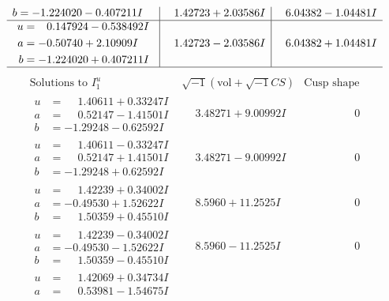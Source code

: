 \documentclass[1p]{elsarticle_modified}
\theoremstyle{definition}
\newcommand{\I}{\sqrt{-1}}
\begin{document}
$$\begin{array}{c|c|c}
\begin{aligned}
b &= -1.224020 - 0.407211 I\end{aligned}
 & \phantom{-}1.42723 + 2.03586 I & \phantom{-}6.04382 - 1.04481 I \\ \hline\begin{aligned}
u &= \phantom{-}0.147924 - 0.538492 I \\
a &= -0.50740 + 2.10909 I \\
b &= -1.224020 + 0.407211 I\end{aligned}
 & \phantom{-}1.42723 - 2.03586 I & \phantom{-}6.04382 + 1.04481 I\\
 \hline 
 \end{array}$$\newpage$$\begin{array}{c|c|c}  
\text{Solutions to }I^u_{1}& \I (\text{vol} + \sqrt{-1}CS) & \text{Cusp shape}\\
 \hline 
\begin{aligned}
u &= \phantom{-}1.40611 + 0.33247 I \\
a &= \phantom{-}0.52147 - 1.41501 I \\
b &= -1.29248 - 0.62592 I\end{aligned}
 & \phantom{-}3.48271 + 9.00992 I & \phantom{-0.000000 } 0 \\ \hline\begin{aligned}
u &= \phantom{-}1.40611 - 0.33247 I \\
a &= \phantom{-}0.52147 + 1.41501 I \\
b &= -1.29248 + 0.62592 I\end{aligned}
 & \phantom{-}3.48271 - 9.00992 I & \phantom{-0.000000 } 0 \\ \hline\begin{aligned}
u &= \phantom{-}1.42239 + 0.34002 I \\
a &= -0.49530 + 1.52622 I \\
b &= \phantom{-}1.50359 + 0.45510 I\end{aligned}
 & \phantom{-}8.5960 + 11.2525 I & \phantom{-0.000000 } 0 \\ \hline\begin{aligned}
u &= \phantom{-}1.42239 - 0.34002 I \\
a &= -0.49530 - 1.52622 I \\
b &= \phantom{-}1.50359 - 0.45510 I\end{aligned}
 & \phantom{-}8.5960 - 11.2525 I & \phantom{-0.000000 } 0 \\ \hline\begin{aligned}
u &= \phantom{-}1.42069 + 0.34734 I \\
a &= \phantom{-}0.53981 - 1.54675 I \\

\end{aligned}
\end{array}$$
\end{document}
